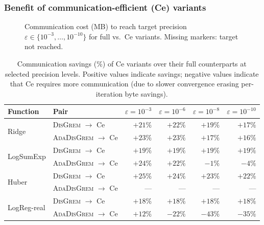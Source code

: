 \documentclass[review,onefignum,onetabnum]{siamart171218}
\begin{document}
	\subsubsection{Benefit of communication-efficient (Ce) variants}
	
	\begin{figure}[htbp]
		\centering
		\caption{Communication cost (MB) to reach target precision
			$\varepsilon\in\{10^{-3},\ldots,10^{-10}\}$ for full vs.\ Ce variants.
			Missing markers: target not reached.}
		\label{fig:ce_benefit}
	\end{figure}
	
	\begin{table}[htbp]
		\centering
		\caption{Communication savings (\%) of Ce variants over their full
			counterparts at selected precision levels.
			Positive values indicate savings; negative values indicate that
			Ce requires more communication (due to slower convergence
			erasing per-iteration byte savings).}
		\label{tab:ce_savings}
		\setlength{\tabcolsep}{5pt}
		\small
		\begin{tabular}{llrrrr}
			\toprule
			Function & Pair & $\varepsilon{=}10^{-3}$ & $\varepsilon{=}10^{-6}$ & $\varepsilon{=}10^{-8}$ & $\varepsilon{=}10^{-10}$ \\
			\midrule
			\multirow{2}{*}{Ridge}
			& \textsc{DisGrem} $\to$ Ce       & $+21\%$ & $+22\%$  & $+19\%$ & $+17\%$ \\
			& \textsc{AdaDisGrem} $\to$ Ce    & $+23\%$ & $+23\%$  & $+17\%$ & $+16\%$ \\
			\midrule
			\multirow{2}{*}{LogSumExp}
			& \textsc{DisGrem} $\to$ Ce       & $+19\%$ & $+19\%$  & $+19\%$ & $+19\%$ \\
			& \textsc{AdaDisGrem} $\to$ Ce    & $+24\%$ & $+22\%$  & $-1\%$  & $-4\%$  \\
			\midrule
			\multirow{2}{*}{Huber}
			& \textsc{DisGrem} $\to$ Ce       & $+25\%$ & $+24\%$  & $+23\%$ & $+22\%$ \\
			& \textsc{AdaDisGrem} $\to$ Ce    & ---     & ---      & ---     & ---     \\
			\midrule
			\multirow{2}{*}{LogReg-real}
			& \textsc{DisGrem} $\to$ Ce       & $+18\%$ & $+18\%$  & $+18\%$ & $+18\%$ \\
			& \textsc{AdaDisGrem} $\to$ Ce    & $+12\%$ & $-22\%$  & $-43\%$ & $-35\%$ \\
			\bottomrule
		\end{tabular}
	\end{table}
	
\end{document}
